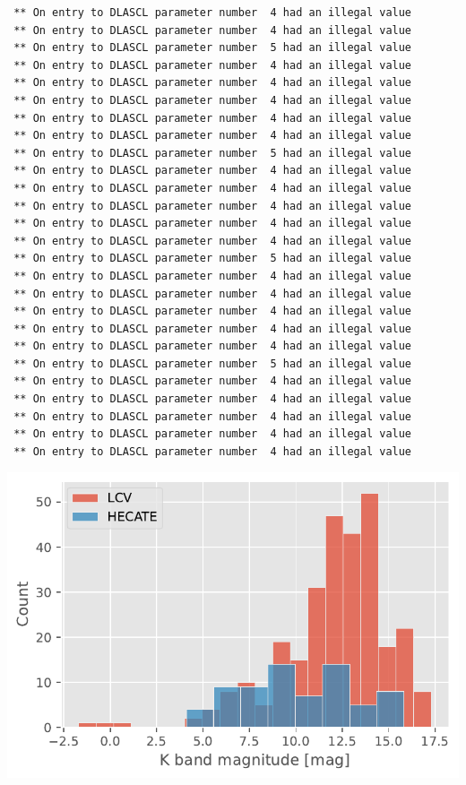 \documentclass[
]{article}
\begin{document}
\begin{verbatim}
 ** On entry to DLASCL parameter number  4 had an illegal value
 ** On entry to DLASCL parameter number  4 had an illegal value
 ** On entry to DLASCL parameter number  5 had an illegal value
 ** On entry to DLASCL parameter number  4 had an illegal value
 ** On entry to DLASCL parameter number  4 had an illegal value
 ** On entry to DLASCL parameter number  4 had an illegal value
 ** On entry to DLASCL parameter number  4 had an illegal value
 ** On entry to DLASCL parameter number  4 had an illegal value
 ** On entry to DLASCL parameter number  5 had an illegal value
 ** On entry to DLASCL parameter number  4 had an illegal value
 ** On entry to DLASCL parameter number  4 had an illegal value
 ** On entry to DLASCL parameter number  4 had an illegal value
 ** On entry to DLASCL parameter number  4 had an illegal value
 ** On entry to DLASCL parameter number  4 had an illegal value
 ** On entry to DLASCL parameter number  5 had an illegal value
 ** On entry to DLASCL parameter number  4 had an illegal value
 ** On entry to DLASCL parameter number  4 had an illegal value
 ** On entry to DLASCL parameter number  4 had an illegal value
 ** On entry to DLASCL parameter number  4 had an illegal value
 ** On entry to DLASCL parameter number  4 had an illegal value
 ** On entry to DLASCL parameter number  5 had an illegal value
 ** On entry to DLASCL parameter number  4 had an illegal value
 ** On entry to DLASCL parameter number  4 had an illegal value
 ** On entry to DLASCL parameter number  4 had an illegal value
 ** On entry to DLASCL parameter number  4 had an illegal value
 ** On entry to DLASCL parameter number  4 had an illegal value
\end{verbatim}

\includegraphics{compare_files/figure-pdf/cell-31-output-2.pdf}
\end{document}
